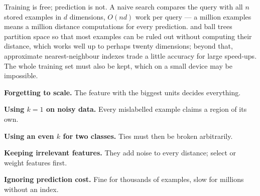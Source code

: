 Training is free; prediction is not. A naive search compares the query with all
$n$ stored examples in $d$ dimensions, $O(nd)$ work per query --- a million
examples means a million distance computations for every prediction.
 and ball trees partition space so that most examples can be
ruled out without computing their distance, which works well up to perhaps twenty
dimensions; beyond that, approximate nearest-neighbour indexes trade a little
accuracy for large speed-ups. The whole training set must also be kept, which on
a small device may be impossible.

\begin{pitfall}
\begin{tight}
  \item \textbf{Forgetting to scale.} The feature with the biggest units decides
        everything.
  \item \textbf{Using $k = 1$ on noisy data.} Every mislabelled example claims a
        region of its own.
  \item \textbf{Using an even $k$ for two classes.} Ties must then be broken
        arbitrarily.
  \item \textbf{Keeping irrelevant features.} They add noise to every distance;
        select or weight features first.
  \item \textbf{Ignoring prediction cost.} Fine for thousands of examples, slow for
        millions without an index.
\end{tight}
\end{pitfall}

